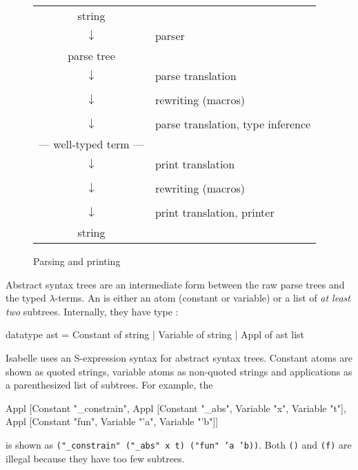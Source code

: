 \begin{figure}
\begin{center}
\begin{tabular}{cl}
string          & \\
$\downarrow$    & parser \\
parse tree      & \\
$\downarrow$    & parse \AST{} translation \\
\AST{}             & \\
$\downarrow$    & \AST{} rewriting (macros) \\
\AST{}             & \\
$\downarrow$    & parse translation, type inference \\
--- well-typed term --- & \\
$\downarrow$    & print translation \\
\AST{}             & \\
$\downarrow$    & \AST{} rewriting (macros) \\
\AST{}             & \\
$\downarrow$    & print \AST{} translation, printer \\
string          &
\end{tabular}

\end{center}
\caption{Parsing and printing}\label{fig:parse_print}
\end{figure}

Abstract syntax trees are an intermediate form between the raw parse trees
and the typed $\lambda$-terms.  An \AST{} is either an atom (constant or
variable) or a list of {\em at least two\/} subtrees.  Internally, they
have type :  
\begin{ttbox}
datatype ast = Constant of string
             | Variable of string
             | Appl of ast list
\end{ttbox}

Isabelle uses an S-expression syntax for abstract syntax trees.  Constant
atoms are shown as quoted strings, variable atoms as non-quoted strings and
applications as a parenthesized list of subtrees.  For example, the \AST
\begin{ttbox}
Appl [Constant "_constrain",
  Appl [Constant "_abs", Variable "x", Variable "t"],
  Appl [Constant "fun", Variable "'a", Variable "'b"]]
\end{ttbox}
is shown as {\tt ("_constrain" ("_abs" x t) ("fun" 'a 'b))}.
Both {\tt ()} and {\tt (f)} are illegal because they have too few
subtrees. 


